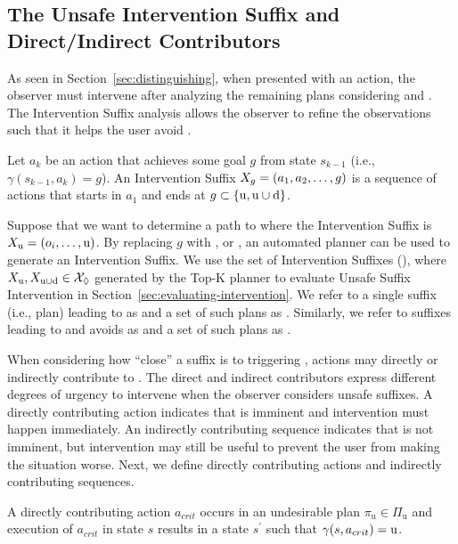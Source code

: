\subsection{The Unsafe Intervention Suffix and Direct/Indirect Contributors}
\label{sec:suffix}
As seen in Section~\ref{sec:distinguishing}, when presented with an action, 
the observer must intervene after analyzing the remaining plans considering \undesired and \dandu. 
The Intervention Suffix analysis allows the observer to refine the observations such that it helps the user avoid \undesired. 

\begin{definition}
  \label{def:suffix}
  Let $a_k$ be an action that achieves some goal $g$ from state $s_{k-1}$ (i.e., $\gamma(s_{k-1}, a_k) = g$).
An Intervention Suffix $X_g = (a_1, a_2, \ldots, g)$ is a sequence of actions that starts in $a_1$ and ends at
 $g \subset \{\mathrm{u}, \mathrm{u}\cup\mathrm{d} \} $.
\end{definition}

Suppose that we want to determine a path to \undesired where the Intervention Suffix is $X_{\mathrm{u}} = (o_i, \ldots, \mathrm{u})$.
By replacing $g$ with \undesired, or \dandu, an automated planner can be used to generate an Intervention Suffix.
We use the set of Intervention Suffixes (\Suffixes), where $X_\mathrm{u}, X_{\mathrm{u}\cup\mathrm{d}} \in \mathcal{X}_\Diamond$ generated by the Top-K planner \cite{riabov2014} to evaluate Unsafe Suffix Intervention in Section~\ref{sec:evaluating-intervention}.
We refer to a single suffix (i.e., plan) leading to \undesired as \planUndesired and a set of such plans as \PlansUndesired.
Similarly, we refer to suffixes leading to \desired and avoids \undesired as \planDesired and a set of such plans as \PlansDesired.

When considering how ``close'' a suffix is to triggering \undesired, actions may directly or indirectly contribute to \undesired.
The direct and indirect contributors express different degrees of urgency to intervene when the observer considers unsafe suffixes. 
A directly contributing action indicates that \undesired is imminent and intervention must happen immediately. 
An indirectly contributing sequence indicates that \undesired is not imminent, but
intervention may still be useful to prevent the user from making the situation worse.
Next, we define directly contributing actions and indirectly contributing sequences. 

\begin{definition}
\label{def:direct}
A \textnormal{directly contributing action} $a_{crit}$ occurs in an undesirable plan $\pi_{\mathrm{u}}\in \Pi_{\mathrm{u}}$ and execution of $a_{crit}$ in state $s$ results in a state $s^\prime$ such that $\gamma(s,a_{crit})=\mathrm{u}$. 
\end{definition}


